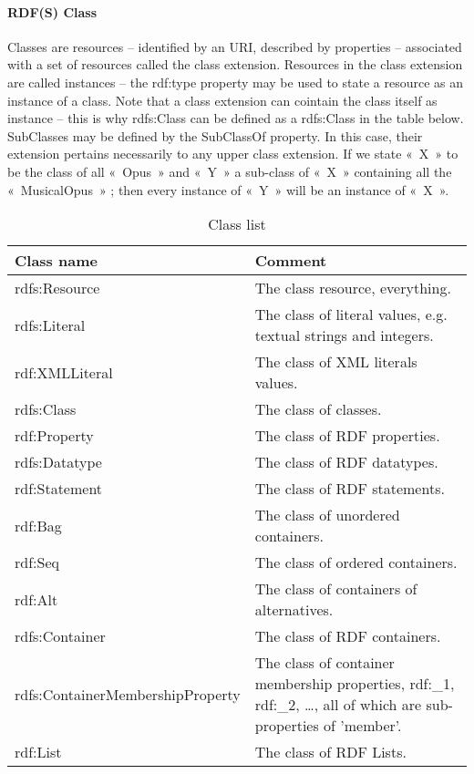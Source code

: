 \paragraph{RDF(S) Class}
Classes are resources – identified by an URI, described by properties – associated with a set of resources called the class extension. 
Resources in the class extension  are called instances – the rdf:type property may be used to state a resource as an instance of a class. 
Note that a class extension can cointain the class itself as instance – this is why rdfs:Class can be defined as a rdfs:Class in the table below.
SubClasses may be defined by the SubClassOf property. In this case, their extension pertains necessarily to any upper class extension. 
If we state « X » to be the class of all « Opus » and « Y » a sub-class of « X » containing all the « MusicalOpus » ; then every instance of « Y » will be an instance of « X ». 

\begin{table}[ht!]
   \begin{center}
		\begin{tabularx}{400pt}{|l|X|}
		   \hline
		Class name & Comment\\ \hline\hline
		rdfs:Resource & The class resource, everything.\\ \hline
		rdfs:Literal & The class of literal values, e.g. textual strings and integers.\\ \hline
		rdf:XMLLiteral & The class of XML literals values.\\ \hline
		rdfs:Class & The class of classes.\\ \hline
		rdf:Property & The class of RDF properties.\\ \hline
		rdfs:Datatype & The class of RDF datatypes.\\ \hline
		rdf:Statement & The class of RDF statements.\\ \hline
		rdf:Bag & The class of unordered containers.\\ \hline
		rdf:Seq & The class of ordered containers.\\ \hline
		rdf:Alt & The class of containers of alternatives.\\ \hline
		rdfs:Container & The class of RDF containers.\\ \hline
		rdfs:ContainerMembershipProperty & The class of container membership properties, rdf:\_1, rdf:\_2, \dots, all of which are sub-properties of 'member'.\\ \hline
		rdf:List & The class of RDF Lists.\\ \hline
		\end{tabularx}
		\caption{Class list \label{tab:rdfs-classes}}
   \end{center}
\end{table}

